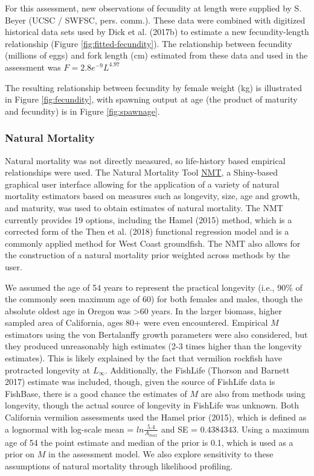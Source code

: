 \documentclass[
  english,
  a4paper,
]{article}
\begin{document}
For this assessment, new observations of fecundity at length were supplied by S. Beyer (UCSC / SWFSC, pers. comm.). These data were combined with digitized historical data sets used by Dick et al. (2017b) to estimate a new fecundity-length relationship (Figure \ref{fig:fitted-fecundity}). The relationship between fecundity (millions of eggs) and fork length (cm) estimated from these data and used in the assessment was
\(F = 2.8e^{-9}L^{4.97}\)

The resulting relationship between fecundity by female weight (kg) is illustrated in Figure \ref{fig:fecundity}, with spawning output at age (the product of maturity and fecundity) is in Figure \ref{fig:spawnage}.

\hypertarget{natural-mortality}{%
\subsubsection{Natural Mortality}\label{natural-mortality}}

Natural mortality was not directly measured, so life-history based empirical
relationships were used. The Natural Mortality Tool
\href{https://github.com/shcaba/Natural-Mortality-Tool}{NMT}, a Shiny-based
graphical user interface allowing for the application of a variety of natural
mortality estimators based on measures such as longevity, size, age and growth,
and maturity, was used to obtain estimates of natural mortality. The NMT currently
provides 19 options, including the Hamel (2015) method, which is a corrected
form of the Then et al. (2018) functional regression model and is a commonly
applied method for West Coast groundfish. The NMT also allows for the construction
of a natural mortality prior weighted across methods by the user.

We assumed the age of 54 years to represent the practical longevity (i.e., 90\% of
the commonly seen maximum age of 60) for both females and males, though the absolute
oldest age in Oregon was \textgreater60 years. In the larger biomass, higher sampled area of
California, ages 80+ were even encountered. Empirical \(M\) estimators using the von
Bertalanffy growth parameters were also considered, but they produced unreasonably
high estimates (2-3 times higher than the longevity estimates). This is likely
explained by the fact that vermilion rockfish have protracted longevity at \(L_{\infty}\).
Additionally, the FishLife (Thorson and Barnett 2017) estimate was included, though, given
the source of FishLife data is FishBase, there is a good chance the estimates of
\(M\) are also from methods using longevity, though the actual source of longevity
in FishLife was unknown.
Both California vermilion assessments used the Hamel prior (2015), which
is defined as a lognormal with log-scale mean = \(ln\frac{5.4}{A_{max}}\) and SE = 0.4384343.
Using a maximum age of 54 the point estimate and median of the prior is 0.1, which
is used as a prior on \(M\) in the assessment model. We also explore sensitivity to
these assumptions of natural mortality through likelihood profiling.
\end{document}
